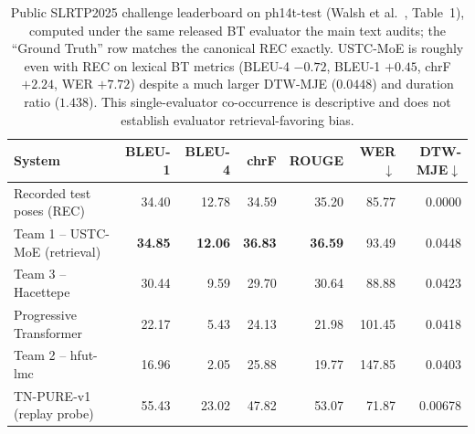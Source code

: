 \documentclass[pdflatex,sn-chicago]{sn-jnl}
\begin{document}
\begin{table}[h]
\centering
\scriptsize\setlength{\tabcolsep}{3pt}
\caption{Public SLRTP2025 challenge leaderboard on ph14t-test (Walsh et al.~\cite{slrtp2025}, Table~1), computed under the same released BT evaluator the main text audits; the ``Ground Truth'' row matches the canonical REC exactly. USTC-MoE is roughly even with REC on lexical BT metrics (BLEU-4 $-0.72$, BLEU-1 $+0.45$, chrF $+2.24$, WER $+7.72$) despite a much larger DTW-MJE ($0.0448$) and duration ratio ($1.438$). This single-evaluator co-occurrence is descriptive and does not establish evaluator retrieval-favoring bias.}
\label{tab:s4_slrtp_leaderboard}
\begin{tabular}{lrrrrrr}
\toprule
System & BLEU-1 & BLEU-4 & chrF & ROUGE & WER$\downarrow$ & DTW-MJE$\downarrow$ \\
\midrule
Recorded test poses (REC) & 34.40 & 12.78 & 34.59 & 35.20 & 85.77 & 0.0000 \\
Team 1 -- USTC-MoE (retrieval) & \textbf{34.85} & \textbf{12.06} & \textbf{36.83} & \textbf{36.59} & 93.49 & 0.0448 \\
Team 3 -- Hacettepe          & 30.44 & 9.59 & 29.70 & 30.64 & 88.88 & 0.0423 \\
Progressive Transformer      & 22.17 & 5.43 & 24.13 & 21.98 & 101.45 & 0.0418 \\
Team 2 -- hfut-lmc           & 16.96 & 2.05 & 25.88 & 19.77 & 147.85 & 0.0403 \\
\midrule
TN-PURE-v1 (replay probe)    & 55.43 & 23.02 & 47.82 & 53.07 & 71.87 & 0.00678 \\
\bottomrule
\end{tabular}
\end{table}
\end{document}
